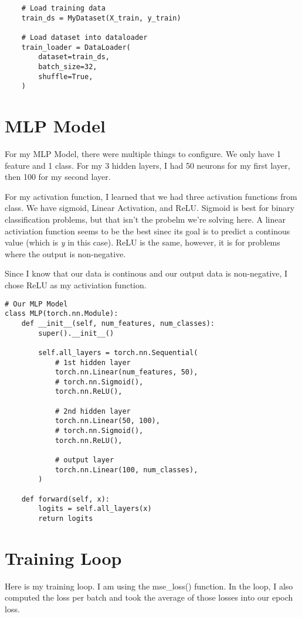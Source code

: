 \documentclass{article}
\begin{document}
\begin{lstlisting}
    # Load training data
    train_ds = MyDataset(X_train, y_train)

    # Load dataset into dataloader
    train_loader = DataLoader(
        dataset=train_ds,
        batch_size=32,
        shuffle=True,
    )
\end{lstlisting}

\section{MLP Model}
For my MLP Model, there were multiple things to configure. We only have 1 feature and 1 class. For my 3 hidden layers, I had 50 neurons for my first layer, then 100 for my second layer.

For my activation function, I learned that we had three activation functions from class. We have sigmoid, Linear Activation, and ReLU. Sigmoid is best for binary classification problems, but that isn't the probelm we're solving here. A linear activiation function seems to be the best sinec its goal is to predict a continous value (which is \textit{y} in this case). ReLU is the same, however, it is for problems where the output is non-negative.

Since I know that our data is continous and our output data is non-negative, I chose ReLU as my activiation function.
\begin{lstlisting}
# Our MLP Model
class MLP(torch.nn.Module):
    def __init__(self, num_features, num_classes):
        super().__init__()

        self.all_layers = torch.nn.Sequential(
            # 1st hidden layer
            torch.nn.Linear(num_features, 50),
            # torch.nn.Sigmoid(),
            torch.nn.ReLU(),

            # 2nd hidden layer
            torch.nn.Linear(50, 100),
            # torch.nn.Sigmoid(),
            torch.nn.ReLU(),

            # output layer
            torch.nn.Linear(100, num_classes),
        )

    def forward(self, x):
        logits = self.all_layers(x)
        return logits
\end{lstlisting}

\section{Training Loop}
Here is my training loop. I am using the mse\_loss() function. In the loop, I also computed the loss per batch and took the average of those losses into our epoch loss.
\end{document}
